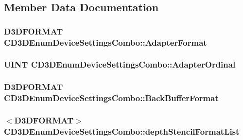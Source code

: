 \subsection{Member Data Documentation}
\hypertarget{struct_c_d3_d_enum_device_settings_combo_a4141e11ae457b2faf9b7e910e5a3167b}{
\subsubsection[{AdapterFormat}]{\setlength{\rightskip}{0pt plus 5cm}D3DFORMAT {\bf CD3DEnumDeviceSettingsCombo::AdapterFormat}}}
\label{struct_c_d3_d_enum_device_settings_combo_a4141e11ae457b2faf9b7e910e5a3167b}
\hypertarget{struct_c_d3_d_enum_device_settings_combo_aebf0b6ad3f1036fcba5a7742fb49059d}{
\subsubsection[{AdapterOrdinal}]{\setlength{\rightskip}{0pt plus 5cm}UINT {\bf CD3DEnumDeviceSettingsCombo::AdapterOrdinal}}}
\label{struct_c_d3_d_enum_device_settings_combo_aebf0b6ad3f1036fcba5a7742fb49059d}
\hypertarget{struct_c_d3_d_enum_device_settings_combo_af71e8a8d9f1f739dce1e9ed608bcba48}{
\subsubsection[{BackBufferFormat}]{\setlength{\rightskip}{0pt plus 5cm}D3DFORMAT {\bf CD3DEnumDeviceSettingsCombo::BackBufferFormat}}}
\label{struct_c_d3_d_enum_device_settings_combo_af71e8a8d9f1f739dce1e9ed608bcba48}
\hypertarget{struct_c_d3_d_enum_device_settings_combo_a4c94ea1feca7fa92797bb93dd1e53e9a}{
\subsubsection[{depthStencilFormatList}]{$<$D3DFORMAT$>$ {\bf CD3DEnumDeviceSettingsCombo::depthStencilFormatList}}}
